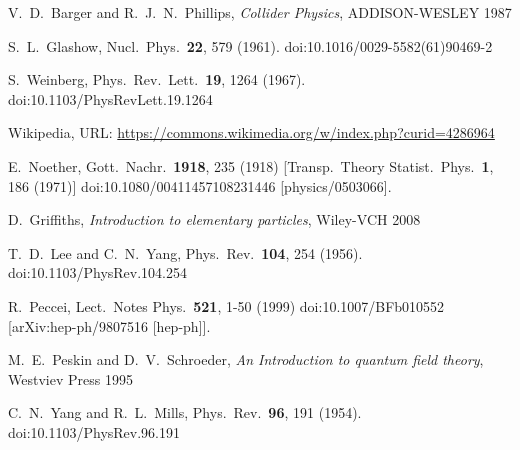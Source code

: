 \newpage

\begin{thebibliography}{99}

\vspace{0.5cm}

  V.~D.~Barger and R.~J.~N.~Phillips,
  \textit{Collider Physics},
   ADDISON-WESLEY 1987 

  S.~L.~Glashow,
  Nucl.\ Phys.\  {\bf 22}, 579 (1961).
  doi:10.1016/0029-5582(61)90469-2
  
  S.~Weinberg,
  Phys.\ Rev.\ Lett.\  {\bf 19}, 1264 (1967).
  doi:10.1103/PhysRevLett.19.1264
  
Wikipedia, URL: \url{https://commons.wikimedia.org/w/index.php?curid=4286964}


  E.~Noether,
  Gott.\ Nachr.\  {\bf 1918}, 235 (1918)
  [Transp.\ Theory Statist.\ Phys.\  {\bf 1}, 186 (1971)]
  doi:10.1080/00411457108231446
  [physics/0503066].
  
  D.~Griffiths,
  \textit{Introduction to elementary particles},
  Wiley-VCH 2008  
      
  
  T.~D.~Lee and C.~N.~Yang,
  Phys.\ Rev.\  {\bf 104}, 254 (1956).
  doi:10.1103/PhysRev.104.254
  
  R.~Peccei,
  Lect.\ Notes Phys.\  \textbf{521}, 1-50 (1999)
  doi:10.1007/BFb010552
  [arXiv:hep-ph/9807516 [hep-ph]].
  
  M.~E.~Peskin and D.~V.~Schroeder,
  \textit{An Introduction to quantum field theory},
  Westviev Press 1995
  
  C.~N.~Yang and R.~L.~Mills,
  Phys.\ Rev.\  {\bf 96}, 191 (1954).
  doi:10.1103/PhysRev.96.191
  

\end{thebibliography}

